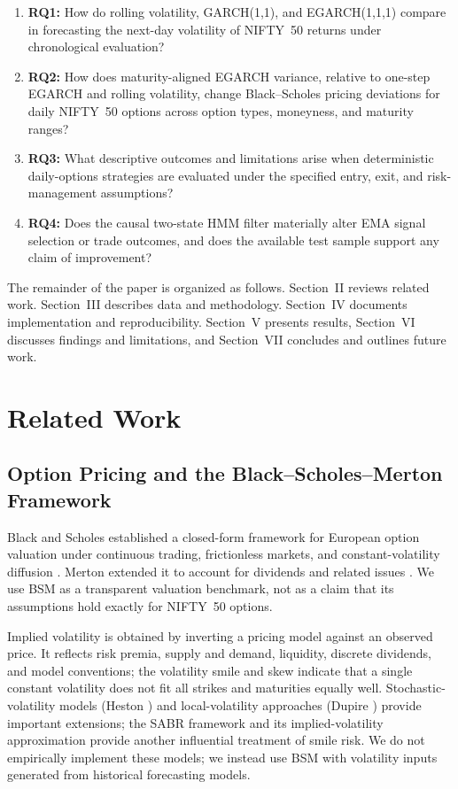 \documentclass[journal]{IEEEtran}
\begin{document}
\begin{enumerate}
\item \textbf{RQ1:} How do rolling volatility, GARCH(1,1), and EGARCH(1,1,1) compare in forecasting the next-day volatility of NIFTY~50 returns under chronological evaluation?
\item \textbf{RQ2:} How does maturity-aligned EGARCH variance, relative to one-step EGARCH and rolling volatility, change Black--Scholes pricing deviations for daily NIFTY~50 options across option types, moneyness, and maturity ranges?
\item \textbf{RQ3:} What descriptive outcomes and limitations arise when deterministic daily-options strategies are evaluated under the specified entry, exit, and risk-management assumptions?
\item \textbf{RQ4:} Does the causal two-state HMM filter materially alter EMA signal selection or trade outcomes, and does the available test sample support any claim of improvement?
\end{enumerate}

The remainder of the paper is organized as follows. Section~II reviews related work. Section~III describes data and methodology. Section~IV documents implementation and reproducibility. Section~V presents results, Section~VI discusses findings and limitations, and Section~VII concludes and outlines future work.

\section{Related Work}

\subsection{Option Pricing and the Black--Scholes--Merton Framework}

Black and Scholes established a closed-form framework for European option valuation under continuous trading, frictionless markets, and constant-volatility diffusion \cite{black1973}. Merton extended it to account for dividends and related issues \cite{merton1973}. We use BSM as a transparent valuation benchmark, not as a claim that its assumptions hold exactly for NIFTY~50 options.

Implied volatility is obtained by inverting a pricing model against an observed price. It reflects risk premia, supply and demand, liquidity, discrete dividends, and model conventions; the volatility smile and skew indicate that a single constant volatility does not fit all strikes and maturities equally well. Stochastic-volatility models (Heston \cite{heston1993}) and local-volatility approaches (Dupire \cite{dupire1994}) provide important extensions; the SABR framework and its implied-volatility approximation \cite{sabr2002} provide another influential treatment of smile risk. We do not empirically implement these models; we instead use BSM with volatility inputs generated from historical forecasting models.
\end{document}
